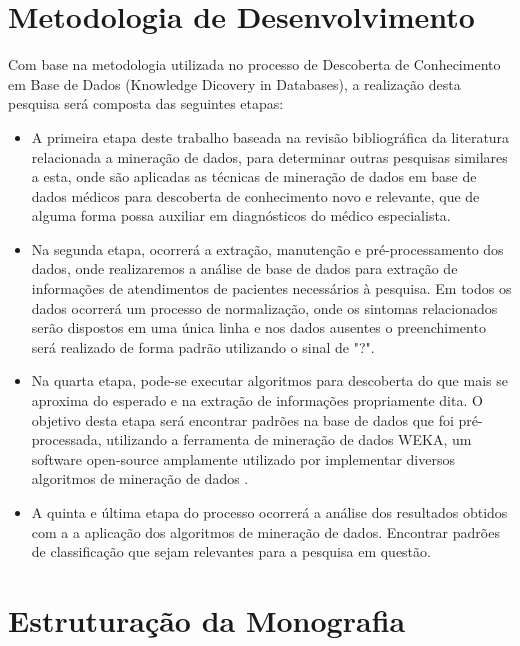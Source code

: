 \documentclass[
	12pt,				%
	openright,			%
	oneside,	
	a4paper,				%
	english,				%
	brazil				%
]{abntex2/abntex2} %
\begin{document}
	\section{Metodologia de Desenvolvimento}
		
		Com base na metodologia utilizada no processo de Descoberta de Conhecimento em Base de Dados (Knowledge Dicovery in Databases), a realização desta pesquisa será composta das seguintes etapas:
		
		\begin{itemize}
			\item A primeira etapa deste trabalho baseada na revisão bibliográfica da literatura relacionada a mineração de dados, para determinar outras pesquisas similares a esta, onde são aplicadas as técnicas de mineração de dados em base de dados médicos para descoberta de conhecimento novo e relevante, que de alguma forma possa auxiliar em diagnósticos do médico especialista.
			
			\item Na segunda etapa, ocorrerá a extração, manutenção e pré-processamento dos dados, onde realizaremos a análise de base de dados para extração de informações de atendimentos de pacientes necessários à pesquisa. Em todos os dados ocorrerá um processo de normalização, onde os sintomas relacionados serão dispostos em uma única linha e nos dados ausentes o preenchimento será realizado de forma padrão utilizando o sinal de "?".
			
			\item Na quarta etapa, pode-se executar algoritmos para descoberta do que mais se aproxima do esperado e na extração de informações propriamente dita. O objetivo desta etapa será encontrar padrões na base de dados que foi pré-processada, utilizando a ferramenta de mineração de dados WEKA, um software open-source amplamente utilizado por implementar diversos algoritmos de mineração de dados \cite{hall:2009}.
			
			\item A quinta e última etapa do processo ocorrerá a análise dos resultados obtidos com a a aplicação dos algoritmos de mineração de dados. Encontrar padrões de classificação que sejam relevantes para a pesquisa em questão.
			
		\end{itemize}
	
	\section{Estruturação da Monografia}
	
\end{document}
